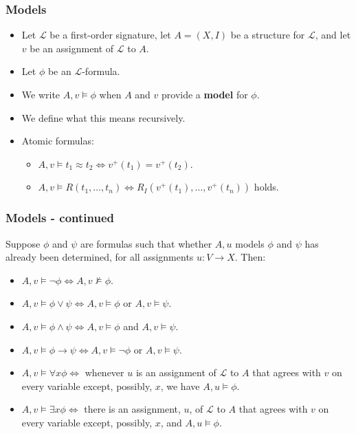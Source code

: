 \documentclass[handout]{beamer}
\newcommand{\sL}{\mathscr{L}}
\begin{document}
\begin{frame}
\frametitle{Models}
\begin{itemize}
\item Let $\sL$ be a first-order signature, let $A=(X,I)$ be a structure for $\sL$, and let $v$ be an assignment of $\sL$ to $A$. 
\vspace{0.3cm}
\item Let $\phi$ be an $\sL$-formula. 
\vspace{0.3cm}
\item We write $A,v\models \phi$ when $A$ and $v$ provide a \textbf{model} for $\phi$.
\vspace{0.3cm}
\item We define what this means recursively. 
\vspace{0.3cm}
\item Atomic formulas:
\vspace{0.1cm}
\begin{itemize}
\item $A,v\models t_1\approx t_2 \iff v^+(t_1)= v^+(t_2)$.
\vspace{0.1cm}
\item $A,v\models R(t_1,\ldots,t_n)\iff R_I(v^+(t_1),\ldots,v^+(t_n))$ holds.
\end{itemize}
\end{itemize}
\end{frame}

\begin{frame}
\frametitle{Models - continued}
Suppose $\phi$ and $\psi$ are formulas such that whether $A,u$ models $\phi$ and $\psi$ has already been determined, for all assignments $u: V\to X$. Then:
\begin{itemize}
\item $A,v\models \neg \phi \iff A,v\not\models \phi$.
\item $A,v\models \phi\vee \psi \iff A,v\models \phi$ or $A,v\models  \psi$.
\item $A,v\models \phi\wedge \psi \iff A,v\models \phi$ and $A,v\models \psi$.
\item $A,v\models \phi\rightarrow \psi \iff A,v\models \neg \phi$ or $A,v\models \psi$.
\item $A,v\models \forall x \phi\iff$ whenever $u$ is an assignment of $\sL$ to $A$ that agrees with $v$ on every variable except, possibly, $x$, we have $A,u\models \phi$.
\item $A,v\models \exists x \phi \iff$ there is an assignment, $u$, of $\sL$ to $A$ that agrees with $v$ on every variable except, possibly, $x$, and $A,u\models \phi$. 
\end{itemize}
\end{frame}
\end{document}
